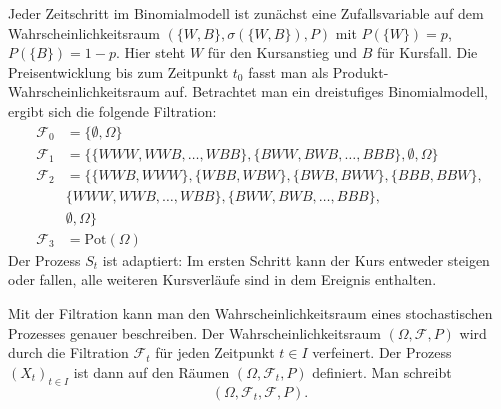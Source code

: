 \begin{bsp}
Jeder Zeitschritt im Binomialmodell ist zunächst eine Zufallsvariable auf dem 
Wahrscheinlichkeitsraum $(\{W, B\}, \sigma(\{W, B\}), P)$ mit 
$P(\{W \}) = p$, $P(\{B \}) = 1-p$. Hier steht $W$ für den Kursanstieg und $B$ für Kursfall. Die Preisentwicklung bis zum Zeitpunkt $t_0$ fasst man als Produkt-Wahrscheinlichkeitsraum auf.
Betrachtet man ein dreistufiges Binomialmodell, ergibt sich die folgende Filtration: 
$$
\begin{aligned}
\mathcal F_0 &= \{\emptyset, \Omega\} \\
\mathcal F_1 &= \{\{WWW, WWB, \dots, WBB \}, \{ BWW, BWB, \dots, BBB \},\emptyset, \Omega \} \\ 
\mathcal F_2 &= \{ \{WWB, WWW \}, \{WBB, WBW \}, \{BWB, BWW \}, \{BBB, BBW \}, \\ &\{WWW, WWB, \dots, WBB \}, \{ BWW, BWB, \dots, BBB \}, \\ &\emptyset, \Omega \} \\
\mathcal F_3 &= \text{Pot}(\Omega)
\end{aligned}
$$
Der Prozess $S_t$ ist adaptiert: Im ersten Schritt kann der Kurs entweder steigen oder
fallen, alle weiteren Kursverläufe sind in dem Ereignis enthalten.

\end{bsp}

\begin{defi}
Mit der Filtration kann man den Wahrscheinlichkeitsraum eines stochastischen Prozesses genauer beschreiben. Der Wahrscheinlichkeitsraum $(\Omega, \mathcal F, P)$ wird durch die Filtration $\mathcal F_t$ für jeden Zeitpunkt $t \in I$ verfeinert. Der Prozess $(X_t)_{t \in I}$ ist dann auf den Räumen $(\Omega, \mathcal F_t, P)$ definiert.
Man schreibt
$$
(\Omega, \mathcal F_t, \mathcal F, P).
$$
\end{defi}

